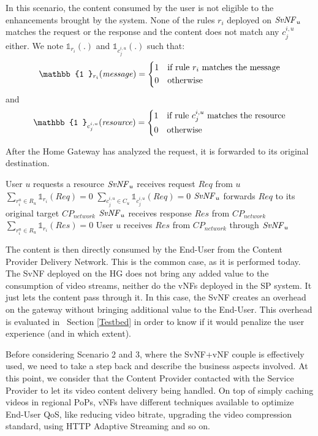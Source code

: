 In this scenario, the content consumed by the user is not eligible to the enhancements brought by the system. None of the rules $r_{i}$ deployed on $\mathit{SvNF}_{u}$ matches the request or the response and the content does not match any $c^{i,u}_{j}$ either. We note $\mathbb{1}_{r_{i}}(.)$ and $\mathbb{1}_{c^{i,u}_{j}}(.)$ such that:
\[
    \mathbb{1 }_{r_{i}}(\mathit{message})= 
\begin{dcases}
    1& \text{if rule $r_{i}$ matches the message} \\
    0              & \text{otherwise}
\end{dcases}
\]
and 
\[
    \mathbb{1 }_{c^{i,u}_{j}}(\mathit{resource})= 
\begin{dcases}
    1& \text{if rule $c^{i,u}_{j}$ matches the resource} \\
    0              & \text{otherwise}
\end{dcases}
\]

After the Home Gateway has analyzed the request, it is forwarded to its original destination.

\begin{algorithmic}[1]
	
\STATE User $u$ requests a resource
\STATE $\mathit{SvNF}_{u}$ receives request $\mathit{Req}$ from $u$
\STATE \( \sum_{r^{u}_{i}\in R_{u}}{\mathbb{1}_{r_{i}}(\mathit{Req})}=0 \)
\STATE \( \sum_{c^{i,u}_{j}\in C_{u}}{\mathbb{1}_{c^{i,u}_{j}}(\mathit{Req})}=0 \)
\STATE $\mathit{SvNF}_{u}$ forwards $\mathit{Req}$ to its original target \(\mathit{CP}_{\mathit{network}}\)
\STATE $\mathit{SvNF}_{u}$ receives response $\mathit{Res}$ from \(\mathit{CP}_{\mathit{network}}\)
\STATE \( \sum_{r^{u}_{i}\in R_{u}}{\mathbb{1}_{r_{i}}(\mathit{Res})}=0 \)
\STATE User $u$ receives $\mathit{Res}$ from \(\mathit{CP}_{\mathit{network}}\) through $\mathit{SvNF}_{u}$
\end{algorithmic}


The content is then directly consumed by the End-User from the Content Provider Delivery Network.
This is the common case, as it is performed today. The SvNF deployed on the HG does not bring any added value to the consumption of video streams, neither do the vNFs deployed in the SP system. It just lets the content pass through it.
In this case, the SvNF creates an overhead on the gateway without bringing additional value to the End-User.
This overhead is evaluated in ~Section \ref{Testbed} in order to know if it would penalize the user experience (and in which extent).

Before considering Scenario 2 and 3, where the SvNF+vNF couple is effectively used, we need to take a step back and describe the business aspects involved. At this point, we consider that the Content Provider contacted with the Service Provider to let its video content delivery being handled. On top of simply caching videos in regional PoPs, vNFs have different techniques available to optimize End-User QoS, like reducing video bitrate, upgrading the video compression standard, using HTTP Adaptive Streaming and so on.

